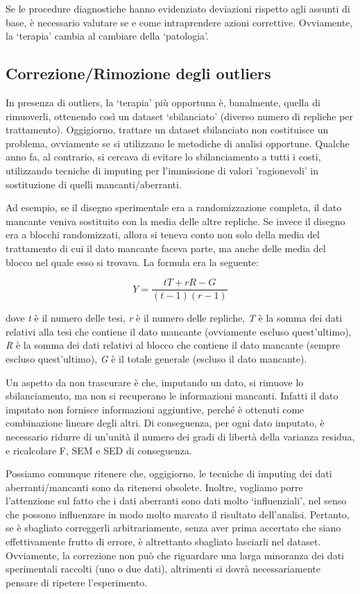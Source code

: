 \documentclass[a4paper,12pt,oneside]{book}
\theoremstyle{definition}
\theoremstyle{definition}
\theoremstyle{definition}
\theoremstyle{remark}
\begin{document}
Se le procedure diagnostiche hanno evidenziato deviazioni rispetto agli
assunti di base, è necessario valutare se e come intraprendere azioni
correttive. Ovviamente, la `terapia' cambia al cambiare della
`patologia'.

\subsection{Correzione/Rimozione degli
outliers}\label{correzionerimozione-degli-outliers}

In presenza di outliers, la `terapia' più opportuna è, banalmente,
quella di rimuoverli, ottenendo così un dataset `sbilanciato' (diverso
numero di repliche per trattamento). Oggigiorno, trattare un dataset
sbilanciato non costituisce un problema, ovviamente se si utilizzano le
metodiche di analisi opportune. Qualche anno fa, al contrario, si
cercava di evitare lo sbilanciamento a tutti i costi, utilizzando
tecniche di imputing per l'immissione di valori 'ragionevoli' in
sostituzione di quelli mancanti/aberranti.

Ad esempio, se il disegno sperimentale era a randomizzazione completa,
il dato mancante veniva sostituito con la media delle altre repliche. Se
invece il disegno era a blocchi randomizzati, allora si teneva conto non
solo della media del trattamento di cui il dato mancante faceva parte,
ma anche delle media del blocco nel quale esso si trovava. La formula
era la seguente:

\[Y = \frac{tT + rR - G}{(t - 1)(r - 1)}\]

dove \emph{t} è il numero delle tesi, \emph{r} è il numero delle
repliche, \emph{T} è la somma dei dati relativi alla tesi che contiene
il dato mancante (ovviamente escluso quest'ultimo), \emph{R} è la somma
dei dati relativi al blocco che contiene il dato mancante (sempre
escluso quest'ultimo), \emph{G} è il totale generale (escluso il dato
mancante).

Un aspetto da non trascurare è che, imputando un dato, si rimuove lo
sbilanciamento, ma non si recuperano le informazioni mancanti. Infatti
il dato imputato non fornisce informazioni aggiuntive, perché è ottenuti
come combinazione lineare degli altri. Di conseguenza, per ogni dato
imputato, è necessario ridurre di un'unità il numero dei gradi di
libertà della varianza residua, e ricalcolare F, SEM e SED di
conseguenza.

Possiamo comunque ritenere che, oggigiorno, le tecniche di imputing dei
dati aberranti/mancanti sono da ritenersi obsolete. Inoltre, vogliamo
porre l'attenzione sul fatto che i dati aberranti sono dati molto
`influenziali', nel senso che possono influenzare in modo molto marcato
il risultato dell'analisi. Pertanto, se è sbagliato correggerli
arbitrariamente, senza aver prima accertato che siano effettivamente
frutto di errore, è altrettanto sbagliato lasciarli nel dataset.
Ovviamente, la correzione non può che riguardare una larga minoranza dei
dati sperimentali raccolti (uno o due dati), altrimenti si dovrà
necessariamente pensare di ripetere l'esperimento.
\end{document}
